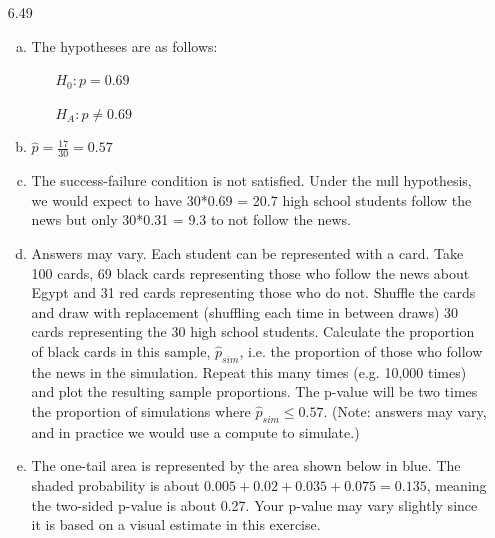 \documentclass[11pt]{article}
\begin{document}
\begin{enumerate}
\begin{enumerate}[(a)]
\end{enumerate}

%

\item[6.49]
\begin{enumerate}[(a)]
\item The hypotheses are as follows:
\begin{itemize}
\item[] $H_0: p = 0.69$
\item[] $H_A: p \ne 0.69$
\end{itemize}

\item $\hat{p} = \frac{17}{30} = 0.57$

\item The success-failure condition is not satisfied. Under the null hypothesis, we would expect to have 30*0.69 = 20.7 high school students follow the news but only 30*0.31 = 9.3 to not follow the news.

\item Answers may vary. Each student can be represented with a card. Take 100 cards, 69 black cards representing those who follow the news about Egypt and 31 red cards representing those who do not. Shuffle the cards and draw with replacement (shuffling each time in between draws) 30 cards representing the 30 high school students. Calculate the proportion of black cards in this sample, $\hat{p}_{sim}$, i.e. the proportion of those who follow the news in the simulation. Repeat this many times (e.g. 10,000 times) and plot the resulting sample proportions. The p-value will be two times the proportion of simulations where $\hat{p}_{sim} \le 0.57$. (Note: answers may vary, and in practice we would use a compute to simulate.)

\item The one-tail area is represented by the area shown below in blue. The shaded probability is about $0.005 + 0.02 + 0.035 + 0.075 = 0.135$, meaning the two-sided p-value is about 0.27. Your p-value may vary slightly since it is based on a visual estimate in this exercise.


\end{enumerate}
\end{enumerate}
\end{document}
